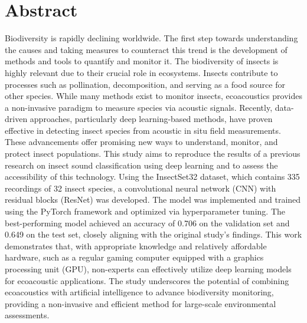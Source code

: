 

\vspace*{\fill}

\section*{Abstract}
\label{abstract}

Biodiversity is rapidly declining worldwide. The first step towards understanding the causes and taking measures to counteract this trend is the development of methods and tools to quantify and monitor it. 
The biodiversity of insects is highly relevant due to their crucial role in ecosystems.
Insects contribute to processes such as pollination, decomposition, and serving as a food source for other species.
While many methods exist to monitor insects, ecoacoustics provides a non-invasive paradigm to measure species via acoustic signals.
Recently, data-driven approaches, particularly deep learning-based methods, have proven effective in detecting insect species from acoustic in situ field measurements.
These advancements offer promising new ways to understand, monitor, and protect insect populations.
This study aims to reproduce the results of a previous research on insect sound 
classification using deep learning and to assess the accessibility of this technology. 
Using the InsectSet32 dataset, which contains 335 recordings of 32 insect species, a 
convolutional neural network (CNN) with residual blocks (ResNet) was developed. 
The model was implemented and trained using the 
PyTorch framework and optimized via hyperparameter tuning. The best-performing model 
achieved an accuracy of 0.706 on the validation set and 0.649 on the test set, 
closely aligning with the original study's findings. This work demonstrates that, 
with appropriate knowledge and relatively affordable hardware, such as a regular 
gaming computer equipped with a graphics processing unit (GPU), non-experts can effectively utilize deep 
learning models for ecoacoustic applications. The study underscores the potential 
of combining ecoacoustics with artificial intelligence to advance biodiversity monitoring, 
providing a non-invasive and efficient method for large-scale environmental assessments.

\vspace*{\fill}